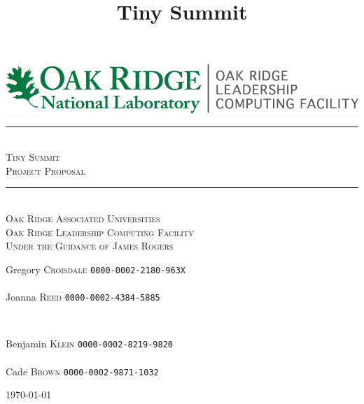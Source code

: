 \documentclass{article}
\title{Tiny Summit}
\begin{document}
\begin{titlepage}
 \center
 \includegraphics[scale=1.5]{OLCF_color.png}\\[2cm]
 \newcommand{\sep}{\rule{\linewidth}{0.5mm}}
 \sep \\[0.4cm]
 \textsc{\huge Tiny Summit}\\[0.4cm]
 \textsc{\large Project Proposal}\\[0.4cm]
 \sep \\[2cm]
 \textsc{\LARGE Oak Ridge Associated Universities}\\[0.5cm]
 \textsc{\Large Oak Ridge Leadership Computing Facility}\\[0.5cm]
 \textsc{\large Under the Guidance of James Rogers}\\[4.6cm]

\vfill
\begin{minipage}{0.4\textwidth}
\begin{flushleft} \large
Gregory \textsc{Croisdale} \texttt{0000-0002-2180-963X}\\~\\
Joanna \textsc{Reed} \texttt{0000-0002-4384-5885}\\
\end{flushleft}
\end{minipage}
~
\begin{minipage}{0.4\textwidth}
\begin{flushright} \large
Benjamin \textsc{Klein} \texttt{0000-0002-8219-9820}\\~\\
Cade \textsc{Brown} \texttt{0000-0002-9871-1032}\\
\end{flushright}
\end{minipage}
{\large \vfill \vspace*{\fill} \today}
\end{titlepage}
\end{document}

